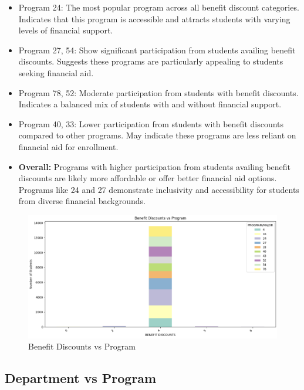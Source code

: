 \documentclass[12pt]{article}
\begin{document}
\begin{itemize}
    \item Program 24: The most popular program across all benefit discount categories. Indicates that this program is accessible and attracts students with varying levels of financial support.

    \item Program 27, 54: Show significant participation from students availing benefit discounts. Suggests these programs are particularly appealing to students seeking financial aid.

    \item Program 78, 52: Moderate participation from students with benefit discounts. Indicates a balanced mix of students with and without financial support.

    \item Program 40, 33: Lower participation from students with benefit discounts compared to other programs. May indicate these programs are less reliant on financial aid for enrollment.

    \item \textbf{Overall: }Programs with higher participation from students availing benefit discounts are likely more affordable or offer better financial aid options. Programs like 24 and 27 demonstrate inclusivity and accessibility for students from diverse financial backgrounds.
\end{itemize}

\begin{figure}[H]
    \centering
    \includegraphics[width=1\linewidth]{benefit_discounts.png}
    \caption{Benefit Discounts vs Program}
\end{figure}

\subsection{Department vs Program}
\end{document}
